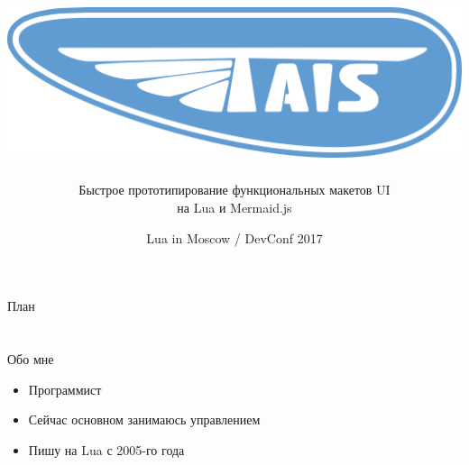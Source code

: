 \documentclass[aspectratio=169,handout,bigger]{beamer}
\title{\includegraphics[height=.15\textheight]{logo}}
\author{Быстрое прототипирование функциональных макетов UI\\на Lua и Mermaid.js}
\institute{Александр Гладыш\\@agladysh}
\date{Lua in Moscow / DevConf 2017}
\begin{document}

\begin{frame}[plain]
 \titlepage
 \vskip 10em
\end{frame}

\usebackgroundtemplate{}


\begin{frame}{План}

\tableofcontents

\end{frame}


\section*{}

\begin{frame}{Обо мне}

\begin{itemize}
\item Программист
\item Сейчас основном занимаюсь управлением
\item Пишу на Lua с 2005-го года
\end{itemize}

\end{frame}
\end{document}
